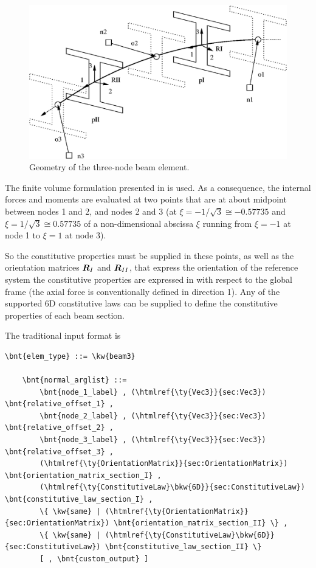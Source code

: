 \begin{figure}
\centering
{}
\includegraphics[width=.7\textwidth]{beam3}
\caption{Geometry of the three-node beam element.}
\label{fig:EL:BEAM:beam3}
\end{figure}

The finite volume formulation presented in \cite{FV-AIAA} is used.
As a consequence, the internal forces and moments are evaluated 
at two points that are at about midpoint between nodes 1 and 2, 
and nodes 2 and 3 (at $ \xi=-1/\sqrt{3}\cong -0.57735 $
and $\xi=1/\sqrt{3} \cong 0.57735$ of a non-dimensional abscissa $\xi$
running from $\xi=-1$ at node 1 to $\xi=1$ at node 3).

So the constitutive properties must be supplied in these points, as well as
the orientation matrices $\boldsymbol{R}_I$ and $\boldsymbol{R}_{II}$,
that express the orientation of the reference system
the constitutive properties are expressed in with respect to the global frame
(the axial force is conventionally defined in direction 1).
Any of the supported 6D constitutive laws can be supplied to define the
constitutive properties of each beam section.

The traditional input format is
\begin{Verbatim}[commandchars=\\\{\}]
    \bnt{elem_type} ::= \kw{beam3}

    \bnt{normal_arglist} ::=
        \bnt{node_1_label} , (\htmlref{\ty{Vec3}}{sec:Vec3}) \bnt{relative_offset_1} ,
        \bnt{node_2_label} , (\htmlref{\ty{Vec3}}{sec:Vec3}) \bnt{relative_offset_2} ,
        \bnt{node_3_label} , (\htmlref{\ty{Vec3}}{sec:Vec3}) \bnt{relative_offset_3} ,
        (\htmlref{\ty{OrientationMatrix}}{sec:OrientationMatrix}) \bnt{orientation_matrix_section_I} ,
        (\htmlref{\ty{ConstitutiveLaw}\bkw{6D}}{sec:ConstitutiveLaw}) \bnt{constitutive_law_section_I} ,
        \{ \kw{same} | (\htmlref{\ty{OrientationMatrix}}{sec:OrientationMatrix}) \bnt{orientation_matrix_section_II} \} ,
        \{ \kw{same} | (\htmlref{\ty{ConstitutiveLaw}\bkw{6D}}{sec:ConstitutiveLaw}) \bnt{constitutive_law_section_II} \}
        [ , \bnt{custom_output} ]
\end{Verbatim}

